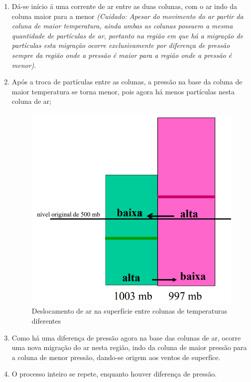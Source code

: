 \documentclass[
12pt,				%
openright,			%
oneside,			%
a4paper,			%
chapter=TITLE,		%
english,			%
brazil				%
]{abntex2}
\begin{document}
\begin{enumerate}[label=\roman *)]
\begin{enumerate}[label=\alph *)]
\begin{figure}[htb!]
						\end{figure}
			\end{enumerate}
		\item Dá-se início á uma corrente de ar entre as duas colunas, com o ar indo da coluna maior para a menor \textit{(Cuidado: Apesar do movimento do ar partir da coluna de maior temperatura, ainda ambas as colunas possuem a mesma quantidade de partículas de ar, portanto na região em que há a migração de partículas esta migração ocorre exclusivamente por diferença de pressão sempre da região onde a pressão é maior para a região onde a pressão é menor)}.
		\item Após a troca de partículas entre as colunas, a pressão na base da coluna de maior temperatura se torna menor, pois agora há menos partículas nesta coluna de ar;
			\begin{figure}[htb!]
				\centering
				\includegraphics[width=.45\linewidth]{img/deslocamento-ar-02.png}
				\caption{Deslocamento de ar na superfície entre colunas de temperaturas diferentes}
				\label{fig:gradiente02}
			\end{figure}
		\item Como há uma diferença de pressão agora na base das colunas de ar, ocorre uma nova migração do ar nesta região, indo da coluna de maior pressão para a coluna de menor pressão, dando-se origem aos ventos de superfíce.
		\item O processo inteiro se repete, enquanto houver diferença de pressão.
\end{enumerate}

% 
\end{document}
